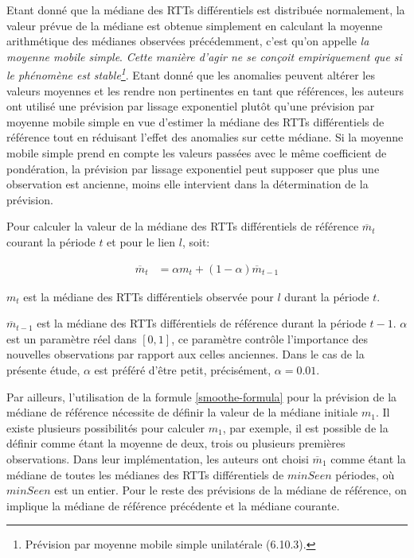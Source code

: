 Etant donné que la médiane des RTTs différentiels est distribuée normalement,  la valeur prévue de la médiane est obtenue simplement en calculant la moyenne arithmétique des médianes observées précédemment, c'est qu'on appelle \textit{la moyenne mobile simple}. \textit{Cette manière d'agir ne se conçoit empiriquement que si le phénomène est stable\footnote{Prévision par moyenne mobile simple unilatérale (6.10.3)\cite{elementdestatistiques}.}}.
Etant donné que les anomalies peuvent altérer les valeurs moyennes et les rendre non pertinentes en tant que références, les auteurs ont utilisé    une prévision par lissage exponentiel 
plutôt qu'une prévision par moyenne mobile simple  en vue d'estimer la médiane des RTTs différentiels de référence tout en réduisant l'effet des anomalies sur cette médiane.
Si  la moyenne mobile simple  prend en compte les valeurs passées avec le même coefficient de pondération,  la prévision par lissage exponentiel peut supposer que plus une observation est ancienne, moins elle intervient dans la détermination de la prévision. 

Pour calculer la  valeur de la médiane des RTTs différentiels de référence $ \overline{m}_{t}$   courant la période $ t $ et pour le lien $l$, soit:

\begin{align}
\overline{m}_{t}& =  \alpha {m}_{t} + (1-  \alpha) \overline{m}_{t-1} \label{smoothe-formula}
\end{align} 

$m_t$ est la médiane des RTTs différentiels observée pour $l$ durant la période $t$. 

$ \overline{m}_{t-1}$  est la médiane des  RTTs différentiels  de référence durant la période $ t-1 $.  
$\alpha$ est un paramètre réel dans $[0,1]$, ce paramètre contrôle l'importance des nouvelles observations par rapport aux celles anciennes. Dans le cas de la présente étude, $\alpha$ est préféré d'être petit, précisément, $ \alpha = 0.01$.

Par ailleurs, l'utilisation de la formule \ref{smoothe-formula} pour la prévision de la médiane de référence nécessite de définir la valeur de la médiane initiale $ {m}_{1}$. Il existe plusieurs possibilités pour calculer $ {m}_{1}$, par exemple, il est possible de la définir comme étant la moyenne de deux, trois ou plusieurs premières observations. Dans leur implémentation, les auteurs ont choisi $\overline{m}_{1}$ comme étant la médiane de toutes les médianes des RTTs différentiels de $minSeen$  périodes, où $minSeen$ est un entier. Pour le reste des prévisions de la médiane de référence, on implique la médiane de référence précédente et  la médiane courante.

